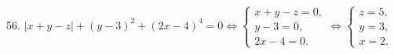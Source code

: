 56. $|x+y-z|+(y-3)^2+(2x-4)^4=0\Leftrightarrow \begin{cases} x+y-z=0,\\ y-3=0,\\ 2x-4=0.\end{cases}\Leftrightarrow\begin{cases} z=5,\\ y=3,\\ x=2.\end{cases}$\\
